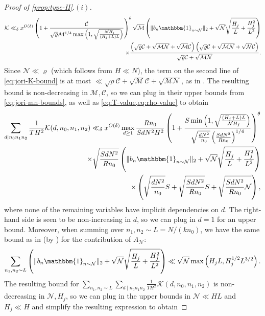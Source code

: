 \documentclass[reqno,11pt]{amsart}
\theoremstyle{remark}
\numberwithin{equation}{section}
\newcommand{\MM}{\mathcal{M}}
\newcommand{\NN}{\mathcal{N}}
\newcommand{\CC}{\mathcal{C}}
\newcommand{\mK}{\mathcal{K}}
\newcommand{\one}{\mathbbm{1}}
\begin{document}
\begin{proof}[Proof of \cref{prop:type-II}.$(i)$]
\begin{equation} \label{eq:jori-K-bound}
\begin{aligned}
    \mK \ll_\delta x^{O(\delta)}
    \left(1 + \frac{\CC}{\sqrt{\varrho} \MM^{1/4} \max\left(1, \sqrt{\frac{\NN H_j}{(H_j+L)L}}\right)} \right)^\theta
    \sqrt{\MM} \left(\|b_n \one_{n \sim \NN}\|_2 + \sqrt{\NN} \sqrt{\frac{H_j}{L} + \frac{H_j^2}{L^2}}\right)
    \\
    \times
    \frac{\left(\sqrt{\varrho}\CC + \sqrt{\MM\NN} + \sqrt{\MM} \CC\right)\left(\sqrt{\varrho}\CC + \sqrt{\MM \NN} + \sqrt{\NN} \CC\right)}{\sqrt{\varrho}\CC + \sqrt{\MM \NN}}.
\end{aligned}
\end{equation}
Since $\NN \ll \varrho$ (which follows from $H \ll N$), the term on the second line of \cref{eq:jori-K-bound} is at most $\ll \sqrt{\rho} \CC + \sqrt{\MM} \CC + \sqrt{\MM \NN}$, as in \cite[p.\,1280]{merikoski2023largest}. The resulting bound is non-decreasing in $\MM, \CC$, so we can plug in their upper bounds from \cref{eq:jori-mn-bounds}, as well as \cref{eq:T-value,eq:rho-value} to obtain
\[
\begin{aligned}
    \sum_{d \mid n_0 n_1 n_2}
    \frac{1}{TH^2} \mK(d, n_0, n_1, n_2)
    \ll_\delta 
    x^{O(\delta)}
    \max_{d \ge 1}
    \frac{Rn_0}{SdN^2 H^2}
    \left(1 + \frac{S \min\left(1, \sqrt{\frac{(H_j+L)L}{\NN H_j}}\right)}{\sqrt{\frac{dN^2}{n_0}} \left(\frac{SdN^2}{Rn_0}\right)^{1/4} } \right)^\theta
    \\ 
    \times
    \sqrt{\frac{SdN^2}{Rn_0}} 
    \left(\|b_n \one_{n \sim \NN}\|_2 + \sqrt{\NN} \sqrt{\frac{H_j}{L} + \frac{H_j^2}{L^2}}\right)
    \\
    \times 
    \left(\sqrt{\frac{dN^2}{n_0}} S + \sqrt{\frac{SdN^2}{Rn_0}} S + \sqrt{\frac{SdN^2}{Rn_0}\NN}\right),
\end{aligned}
\]
where none of the remaining variables have implicit dependencies on $d$. The right-hand side is seen to be non-increasing in $d$, so we can plug in $d = 1$ for an upper bound. Moreover, when summing over $n_1, n_2 \sim L = N/(kn_0)$, we have the same bound as in \cite[bottom of p.\,1280]{merikoski2023largest} (by \cite[Lemma 7]{merikoski2023largest}) for the contribution of $A_{\NN}$:
\[
    \sum_{n_1, n_2 \sim L} \left(\|b_n \one_{n \sim \NN}\|_2 + \sqrt{\NN} \sqrt{\frac{H_j}{L} + \frac{H_j^2}{L^2}} \right) 
    \ll 
    \sqrt{\NN} \max\left(H_jL, H_j^{1/2} L^{3/2}\right).
\]
The resulting bound for $\sum_{n_1, n_2 \sim L} \sum_{d \mid n_0 n_1 n_2} \frac{1}{TH^2} \mK(d, n_0, n_1, n_2)$ is non-decreasing in $\NN, H_j$, so we can plug in the upper bounds in $\NN \ll HL$ and $H_j \ll H$ and simplify the resulting expression to obtain

\end{proof}
\end{document}

